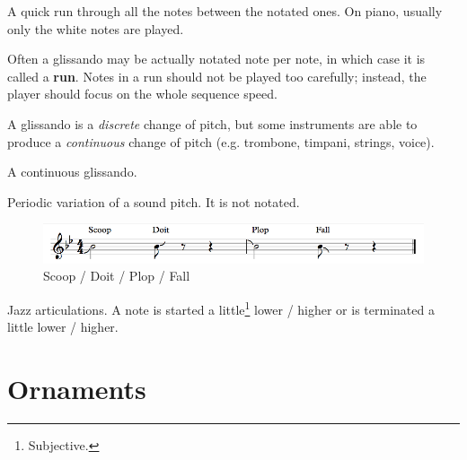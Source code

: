 \begin{definition}[Glissando]
    A quick run through all the notes between the notated ones. On piano, usually only the white notes are played.
\end{definition}

Often a glissando may be actually notated note per note, in which case it is called a \textbf{run}. Notes in a run should not be played too carefully; instead, the player should focus on the whole sequence speed.

A glissando is a \emph{discrete} change of pitch, but some instruments are able to produce a \emph{continuous} change of pitch (e.g. trombone, timpani, strings, voice).

\begin{definition}[Portamento]
    A continuous glissando.
\end{definition}

\begin{definition}[Vibrato]
    Periodic variation of a sound pitch. It is not notated.
\end{definition}

\begin{figure}[h]
    \begin{center}
        \includegraphics[width=1\textwidth]{img/fall}
        \caption{Scoop / Doit / Plop / Fall}
    \end{center}
\end{figure}

\begin{definition}
    Jazz articulations. A note is started a little\footnote{Subjective.} lower / higher or is terminated a little lower / higher.
\end{definition}

\section{Ornaments}

